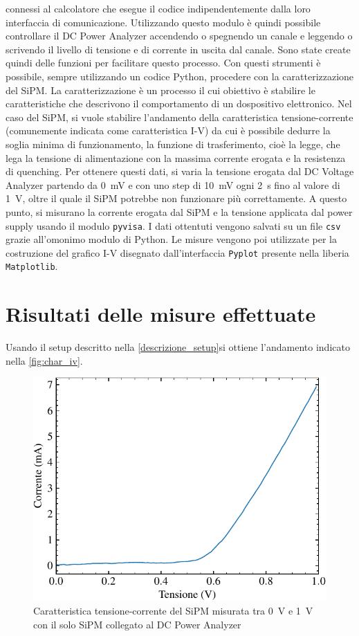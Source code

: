 connessi al calcolatore che esegue il codice indipendentemente dalla loro interfaccia di comunicazione. Utilizzando questo modulo è quindi possibile 
controllare il DC Power Analyzer accendendo o spegnendo un canale e leggendo o scrivendo il livello di tensione e di corrente in uscita dal canale. 
Sono state create quindi delle funzioni per facilitare questo processo.
 Con questi strumenti è possibile, sempre utilizzando un codice Python, procedere con la caratterizzazione del SiPM.
La caratterizzazione è un processo il cui obiettivo è stabilire le caratteristiche che descrivono il comportamento di un dospositivo elettronico.
Nel caso del SiPM, si vuole stabilire l'andamento della caratteristica tensione-corrente (comunemente indicata come caratteristica I-V) da cui è 
possibile dedurre la soglia minima di funzionamento, la funzione di trasferimento, cioè la legge, che lega la tensione di alimentazione con la 
massima corrente erogata e la resistenza di quenching. Per ottenere questi dati, si varia la tensione erogata dal DC Voltage Analyzer partendo da 
\SI{0}{\milli\volt} e con uno step di \SI{10}{\milli\volt} ogni \SI{2}{\second} fino al valore di \SI{1}{\volt}, oltre il quale il SiPM 
potrebbe non funzionare più correttamente. A questo punto, si misurano la corrente erogata dal SiPM e la tensione applicata dal power supply usando 
il modulo \texttt{pyvisa}. I dati ottentuti vengono salvati su un file \texttt{csv} grazie all'omonimo modulo di Python. Le misure vengono poi
utilizzate per la costruzione del grafico I-V disegnato dall'interfaccia \texttt{Pyplot} presente nella liberia \texttt{Matplotlib}.
\section{Risultati delle misure effettuate}
Usando il setup descritto nella \autoref*{descrizione_setup}si ottiene l'andamento indicato nella \autoref*{fig:char_iv}.
\begin{figure}[h!]
    \centering
    \includegraphics[width=.75\linewidth]{img/char_IV.pdf}
    \caption{Caratteristica tensione-corrente del SiPM misurata tra \SI{0}{\volt} e \SI{1}{\volt} con il solo SiPM collegato al DC Power Analyzer}
    \label{fig:char_iv}
\end{figure}


